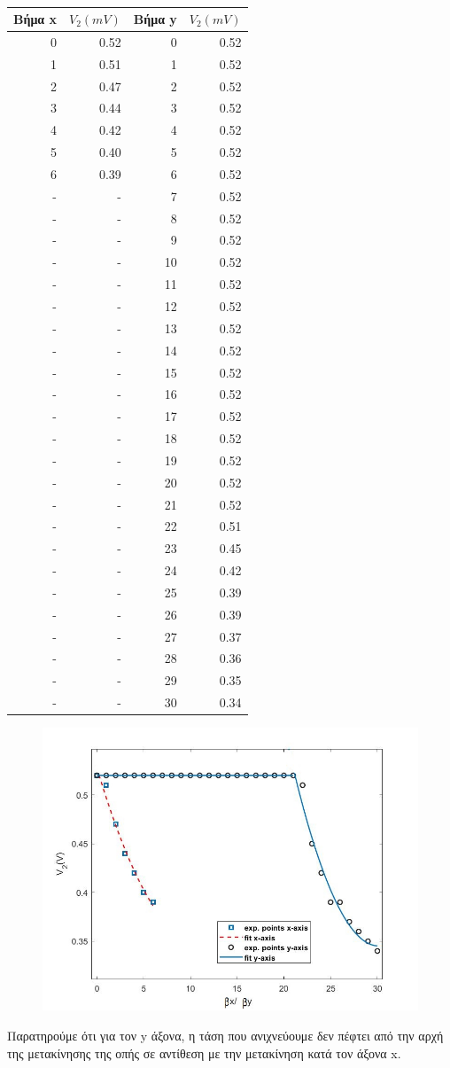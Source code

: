 \documentclass[a4paper]{article}
\begin{document}
		\begin{table}[h!]
			\centering
			\begin{tabular}{r|r||r|r}
				Βήμα x & $V_2(mV)$ & Βήμα y & $V_{2}(mV)$ \\\hline\hline
				0&0.52&0&0.52\\
1&0.51&1&0.52\\
2&0.47&2&0.52\\
3&0.44&3&0.52\\
4&0.42&4&0.52\\
5&0.40&5&0.52\\
6&0.39&6&0.52\\
-&-&7&0.52\\
-&-&8&0.52\\
-&-&9&0.52\\
-&-&10&0.52\\
-&-&11&0.52\\
-&-&12&0.52\\
-&-&13&0.52\\
-&-&14&0.52\\
-&-&15&0.52\\
-&-&16&0.52\\
-&-&17&0.52\\
-&-&18&0.52\\
-&-&19&0.52\\
-&-&20&0.52\\
-&-&21&0.52\\
-&-&22&0.51\\
-&-&23&0.45\\
-&-&24&0.42\\
-&-&25&0.39\\
-&-&26&0.39\\
-&-&27&0.37\\
-&-&28&0.36\\
-&-&29&0.35\\
-&-&30&0.34				
			\end{tabular}
			\caption{ }
			\label{mat5}
		\end{table}
		
	\begin{figure}[h!]
		\centering
		\includegraphics[scale=0.7]{plot5.jpg}
		\caption{ }
		\label{im6}
	\end{figure}
	
	Παρατηρούμε ότι για τον y άξονα, η τάση που ανιχνεύουμε δεν πέφτει από την αρχή της μετακίνησης της οπής σε αντίθεση με την μετακίνηση κατά τον άξονα x.
\end{document}
